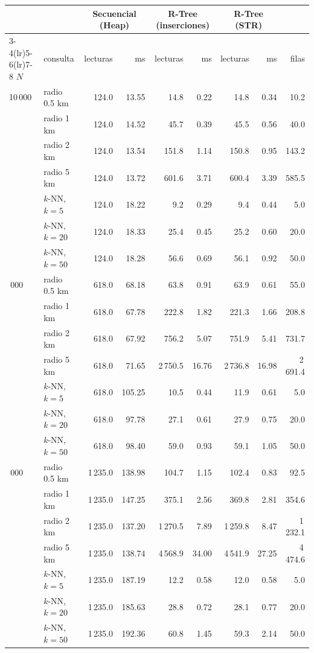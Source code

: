 \begin{tabular}{@{}llrrrrrrr@{}}
\toprule
 & & \multicolumn{2}{c}{Secuencial (Heap)} & \multicolumn{2}{c}{R-Tree (inserciones)} & \multicolumn{2}{c}{R-Tree (STR)} & \\
\cmidrule(lr){3-4}\cmidrule(lr){5-6}\cmidrule(lr){7-8}
$N$ & consulta & lecturas & ms & lecturas & ms & lecturas & ms & filas \\
\midrule
10\,000 & radio 0.5 km & 124.0 & 13.55 & 14.8 & 0.22 & 14.8 & 0.34 & 10.2 \\
 & radio 1 km & 124.0 & 14.52 & 45.7 & 0.39 & 45.5 & 0.56 & 40.0 \\
 & radio 2 km & 124.0 & 13.54 & 151.8 & 1.14 & 150.8 & 0.95 & 143.2 \\
 & radio 5 km & 124.0 & 13.72 & 601.6 & 3.71 & 600.4 & 3.39 & 585.5 \\
 & $k$-NN, $k=5$ & 124.0 & 18.22 & 9.2 & 0.29 & 9.4 & 0.44 & 5.0 \\
 & $k$-NN, $k=20$ & 124.0 & 18.33 & 25.4 & 0.45 & 25.2 & 0.60 & 20.0 \\
 & $k$-NN, $k=50$ & 124.0 & 18.28 & 56.6 & 0.69 & 56.1 & 0.92 & 50.0 \\
\addlinespace
50\,000 & radio 0.5 km & 618.0 & 68.18 & 63.8 & 0.91 & 63.9 & 0.61 & 55.0 \\
 & radio 1 km & 618.0 & 67.78 & 222.8 & 1.82 & 221.3 & 1.66 & 208.8 \\
 & radio 2 km & 618.0 & 67.92 & 756.2 & 5.07 & 751.9 & 5.41 & 731.7 \\
 & radio 5 km & 618.0 & 71.65 & 2\,750.5 & 16.76 & 2\,736.8 & 16.98 & 2\,691.4 \\
 & $k$-NN, $k=5$ & 618.0 & 105.25 & 10.5 & 0.44 & 11.9 & 0.61 & 5.0 \\
 & $k$-NN, $k=20$ & 618.0 & 97.78 & 27.1 & 0.61 & 27.9 & 0.75 & 20.0 \\
 & $k$-NN, $k=50$ & 618.0 & 98.40 & 59.0 & 0.93 & 59.1 & 1.05 & 50.0 \\
\addlinespace
100\,000 & radio 0.5 km & 1\,235.0 & 138.98 & 104.7 & 1.15 & 102.4 & 0.83 & 92.5 \\
 & radio 1 km & 1\,235.0 & 147.25 & 375.1 & 2.56 & 369.8 & 2.81 & 354.6 \\
 & radio 2 km & 1\,235.0 & 137.20 & 1\,270.5 & 7.89 & 1\,259.8 & 8.47 & 1\,232.1 \\
 & radio 5 km & 1\,235.0 & 138.74 & 4\,568.9 & 34.00 & 4\,541.9 & 27.25 & 4\,474.6 \\
 & $k$-NN, $k=5$ & 1\,235.0 & 187.19 & 12.2 & 0.58 & 12.0 & 0.58 & 5.0 \\
 & $k$-NN, $k=20$ & 1\,235.0 & 185.63 & 28.8 & 0.72 & 28.1 & 0.77 & 20.0 \\
 & $k$-NN, $k=50$ & 1\,235.0 & 192.36 & 60.8 & 1.45 & 59.3 & 2.14 & 50.0 \\
\bottomrule
\end{tabular}
